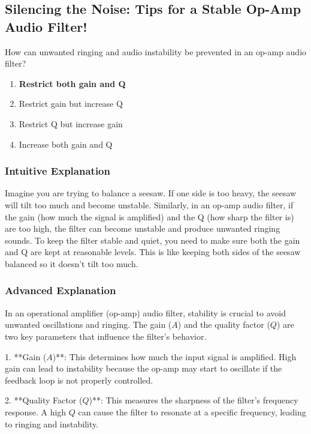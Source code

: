 \subsection{Silencing the Noise: Tips for a Stable Op-Amp Audio Filter!}

\begin{tcolorbox}[colback=gray!10!white,colframe=black!75!black,title=E7G05] How can unwanted ringing and audio instability be prevented in an op-amp audio filter?
    \begin{enumerate}[label=\Alph*)]
        \item \textbf{Restrict both gain and Q}
        \item Restrict gain but increase Q
        \item Restrict Q but increase gain
        \item Increase both gain and Q
    \end{enumerate}
\end{tcolorbox}

\subsubsection*{Intuitive Explanation}
Imagine you are trying to balance a seesaw. If one side is too heavy, the seesaw will tilt too much and become unstable. Similarly, in an op-amp audio filter, if the gain (how much the signal is amplified) and the Q (how sharp the filter is) are too high, the filter can become unstable and produce unwanted ringing sounds. To keep the filter stable and quiet, you need to make sure both the gain and Q are kept at reasonable levels. This is like keeping both sides of the seesaw balanced so it doesn’t tilt too much.

\subsubsection*{Advanced Explanation}
In an operational amplifier (op-amp) audio filter, stability is crucial to avoid unwanted oscillations and ringing. The gain (\(A\)) and the quality factor (\(Q\)) are two key parameters that influence the filter's behavior. 

1. **Gain (\(A\))**: This determines how much the input signal is amplified. High gain can lead to instability because the op-amp may start to oscillate if the feedback loop is not properly controlled.

2. **Quality Factor (\(Q\))**: This measures the sharpness of the filter's frequency response. A high \(Q\) can cause the filter to resonate at a specific frequency, leading to ringing and instability.

